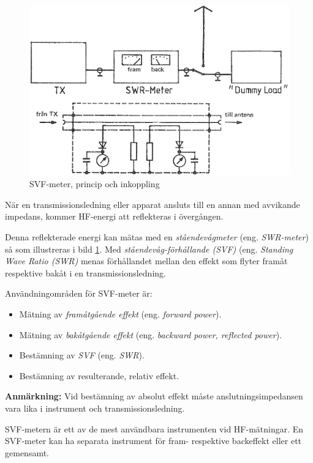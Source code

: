 \begin{figure}
  \includegraphics[width=\textwidth]{images/cropped_pdfs/bild_2_8-09.pdf}
  \caption{SVF-meter, princip och inkoppling}
  \label{fig:bildII8-9}
\end{figure}

När en transmissionsledning eller apparat ansluts till en annan med
avvikande impedans, kommer HF-energi att reflekteras i övergången.

Denna reflekterade energi kan mätas med en \emph{ståendevågmeter}
(eng. \emph{SWR-meter}) så som illustreras i bild \ref{fig:bildII8-9}.
Med \emph{ståendevåg-förhållande (SVF)} (eng. \emph{Standing Wave Ratio (SWR)}
menas förhållandet mellan den effekt som flyter framåt respektive bakåt i en
transmissionsledning.

Användningområden för SVF-meter är:
\begin{itemize}
\item Mätning av \emph{framåtgående effekt} (eng. \emph{forward power}).
\item Mätning av \emph{bakåtgående effekt} (eng. \emph{backward power, reflected power}).
\item Bestämning av \emph{SVF} (eng. \emph{SWR}).
\item Bestämning av resulterande, relativ effekt.
\end{itemize}

\textbf{Anmärkning:} Vid bestämning av absolut effekt måste
anslutningsimpedansen vara lika i instrument och transmissionsledning.

SVF-metern är ett av de mest användbara instrumenten vid HF-mätningar.
En SVF-meter kan ha separata instrument för fram- respektive backeffekt eller
ett gemensamt.

